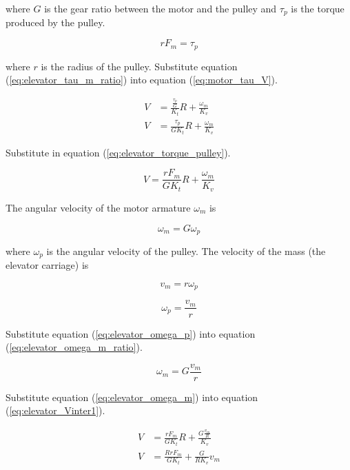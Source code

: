 where $G$ is the gear ratio between the motor and the pulley and $\tau_p$ is the
torque produced by the pulley.

\begin{equation}
  rF_m = \tau_p \label{eq:elevator_torque_pulley}
\end{equation}

where $r$ is the radius of the pulley. Substitute equation
(\ref{eq:elevator_tau_m_ratio}) into equation (\ref{eq:motor_tau_V}).

\begin{align*}
  V &= \frac{\frac{\tau_p}{G}}{K_t} R + \frac{\omega_m}{K_v} \\
  V &= \frac{\tau_p}{GK_t} R + \frac{\omega_m}{K_v}
\end{align*}

Substitute in equation (\ref{eq:elevator_torque_pulley}).

\begin{equation}
  V = \frac{rF_m}{GK_t} R + \frac{\omega_m}{K_v} \label{eq:elevator_Vinter1}
\end{equation}

The angular velocity of the motor armature $\omega_m$ is

\begin{equation}
  \omega_m = G \omega_p \label{eq:elevator_omega_m_ratio}
\end{equation}

where $\omega_p$ is the angular velocity of the pulley. The velocity of the mass
(the elevator carriage) is

\begin{equation*}
  v_m = r \omega_p
\end{equation*}

\begin{equation}
  \omega_p = \frac{v_m}{r} \label{eq:elevator_omega_p}
\end{equation}

Substitute equation (\ref{eq:elevator_omega_p}) into equation
(\ref{eq:elevator_omega_m_ratio}).

\begin{equation}
  \omega_m = G \frac{v_m}{r} \label{eq:elevator_omega_m}
\end{equation}

Substitute equation (\ref{eq:elevator_omega_m}) into equation
(\ref{eq:elevator_Vinter1}).

\begin{align*}
  V &= \frac{rF_m}{GK_t} R + \frac{G \frac{v_m}{R}}{K_v} \\
  V &= \frac{RrF_m}{GK_t} + \frac{G}{RK_v} v_m
\end{align*}


